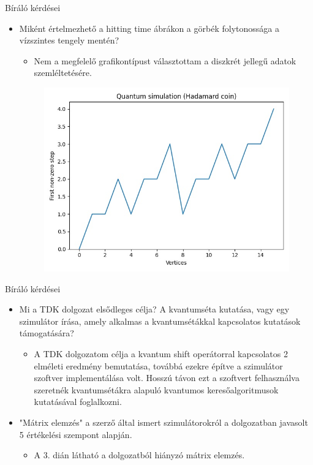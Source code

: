 \documentclass[aspectratio=169]{beamer}
\begin{document}
\begin{frame}{Bíráló kérdései}

\begin{itemize}
    \item Miként értelmezhető a hitting time ábrákon a görbék folytonossága a vízszintes tengely mentén?
    \begin{itemize}
        \item Nem a megfelelő grafikontípust választottam a diszkrét jellegű adatok szemléltetésére.
    \end{itemize}
     \begin{figure}[H]
        \includegraphics[width=0.5\linewidth]{./tdk_figures/results/hypercube/hadamard_hitting_time.jpg}
      \end{figure}
\end{itemize}

\end{frame}


\begin{frame}{Bíráló kérdései}

\begin{itemize}
    \item Mi a TDK dolgozat elsődleges célja? A kvantumséta kutatása, vagy egy szimulátor írása, amely alkalmas a kvantumsétákkal kapcsolatos kutatások támogatására?
    \begin{itemize}
        \item A TDK dolgozatom célja a kvantum shift operátorral kapcsolatos 2 elméleti eredmény bemutatása, továbbá 
        ezekre építve a szimulátor szoftver implementálása volt. Hosszú távon ezt a szoftvert felhasználva szeretnék kvantumsétákra alapuló kvantumos keresőalgoritmusok kutatásával foglalkozni.
    \end{itemize}
    \item "Mátrix elemzés" a szerző által ismert szimulátorokról a dolgozatban javasolt 5 értékelési szempont alapján.
    \begin{itemize}
        \item A 3. dián látható a dolgozatból hiányzó mátrix elemzés.
    \end{itemize}
\end{itemize}

\end{frame}
\end{document}
